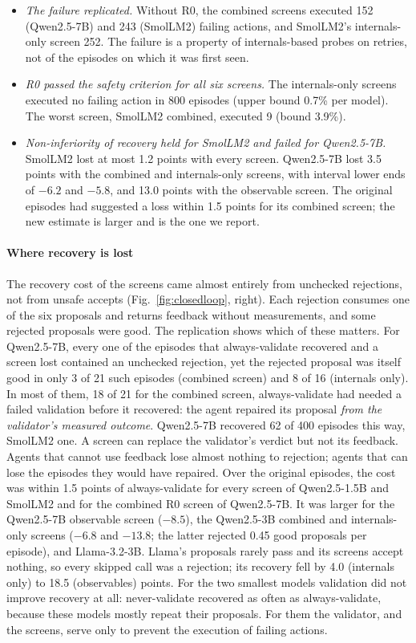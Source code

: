 \begin{itemize}
\item \emph{The failure replicated.} Without R0, the combined screens executed 152 (Qwen2.5-7B) and 243
(SmolLM2) failing actions, and SmolLM2's internals-only screen 252. The failure is a property of internals-based
probes on retries, not of the episodes on which it was first seen.
\item \emph{R0 passed the safety criterion for all six screens.} The internals-only screens executed no failing
action in 800 episodes (upper bound 0.7\% per model). The worst screen, SmolLM2 combined, executed 9 (bound 3.9\%).
\item \emph{Non-inferiority of recovery held for SmolLM2 and failed for Qwen2.5-7B.} SmolLM2 lost at most 1.2 points
with every screen. Qwen2.5-7B lost 3.5 points with the combined and internals-only screens, with interval lower
ends of $-6.2$ and $-5.8$, and 13.0 points with the observable screen. The original episodes had suggested a loss
within 1.5 points for its combined screen; the new estimate is larger and is the one we report.
\end{itemize}



\paragraph{Where recovery is lost} The recovery cost of the screens came almost entirely from unchecked rejections,
not from unsafe accepts (Fig.~\ref{fig:closedloop}, right). Each rejection consumes one of the six proposals and
returns feedback without measurements, and some rejected proposals were good. The replication shows which of these
matters. For Qwen2.5-7B, every one of the episodes that always-validate recovered and a screen lost contained an
unchecked rejection, yet the rejected proposal was itself good in only 3 of 21 such episodes (combined screen) and
8 of 16 (internals only). In most of them, 18 of 21 for the combined screen, always-validate had needed a failed
validation before it recovered: the agent repaired its proposal \emph{from the validator's measured outcome}.
Qwen2.5-7B recovered 62 of 400 episodes this way, SmolLM2 one. A screen can replace the validator's verdict but
not its feedback. Agents that cannot use feedback lose almost nothing to rejection; agents that can lose the
episodes they would have repaired. Over the original episodes, the cost was within 1.5 points of
always-validate for every screen of Qwen2.5-1.5B and SmolLM2 and for the combined R0 screen of Qwen2.5-7B. It was
larger for the Qwen2.5-7B observable screen ($-8.5$), the Qwen2.5-3B combined and internals-only screens ($-6.8$
and $-13.8$; the latter rejected 0.45 good proposals per episode), and Llama-3.2-3B. Llama's proposals rarely pass and its screens
accept nothing, so every skipped call was a rejection; its recovery fell by 4.0 (internals only) to 18.5
(observables) points. For the two smallest models validation did not improve recovery at all: never-validate
recovered as often as always-validate, because these models mostly repeat their proposals. For them the
validator, and the screens, serve only to prevent the execution of failing actions.

